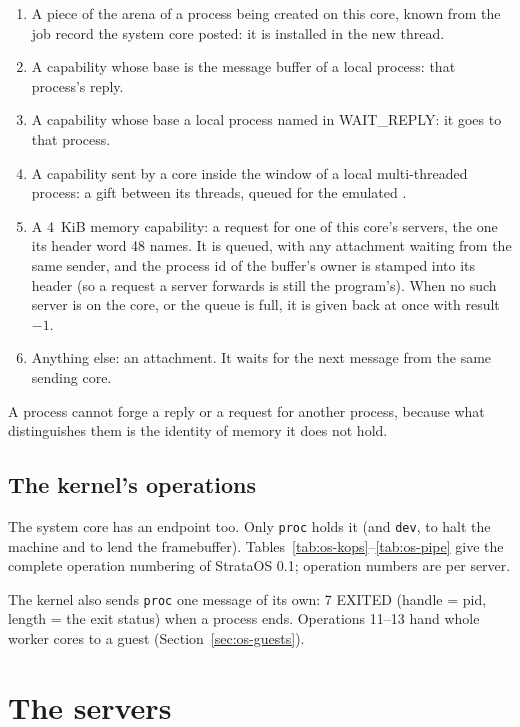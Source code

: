\begin{enumerate}
\item A piece of the arena of a process being created on this core, known from the job record the
  system core posted: it is installed in the new thread.
\item A capability whose base is the message buffer of a local process: that process's reply.
\item A capability whose base a local process named in WAIT\_REPLY: it goes to that process.
\item A capability sent by a core inside the window of a local multi-threaded process: a gift between
  its threads, queued for the emulated .
\item A 4~KiB memory capability: a request for one of this core's servers, the one its header word 48
  names. It is queued, with any attachment waiting from the same sender, and the process id of the
  buffer's owner is stamped into its header (so a request a server forwards is still the program's).
  When no such server is on the core, or the queue is full, it is given back at once with result $-1$.
\item Anything else: an attachment. It waits for the next message from the same sending core.
\end{enumerate}

A process cannot forge a reply or a request for another process, because what distinguishes them is
the identity of memory it does not hold.

\subsection{The kernel's operations}

The system core has an endpoint too. Only \texttt{proc} holds it (and \texttt{dev}, to halt the machine
and to lend the framebuffer). Tables~\ref{tab:os-kops}--\ref{tab:os-pipe} give the complete operation
numbering of StrataOS 0.1; operation numbers are per server.



The kernel also sends \texttt{proc} one message of its own: 7 EXITED (handle = pid, length = the exit
status) when a process ends. Operations 11--13 hand whole worker cores to a guest
(Section~\ref{sec:os-guests}).

\section{The servers}\label{sec:os-servers}

